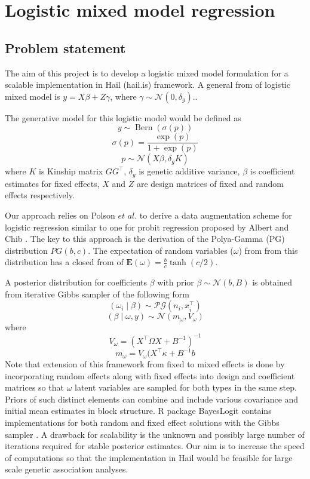 \documentclass [12pt,a4paper]{report}
\begin{document}
\section*{Logistic mixed model regression}
\subsection*{Problem statement}
The aim of this project is to develop a logistic mixed model formulation for a scalable implementation in Hail (hail.is) framework.
A general from of logistic mixed model is   \( y=X\beta + Z\gamma \), where \(\gamma \sim \mathcal{N}(0,\delta_g).\).\par 
The generative model for this logistic model would be defined as \[ y \sim \operatorname{Bern} (\sigma(p)) \]  \[\sigma(p)=\frac{\exp(p)}{1+\exp(p)} \] \[p \sim \mathcal{N}(X\beta, \delta_g K) \]  where $K$ is Kinship matrix $GG^{\intercal}$, $\delta_g$ is genetic additive variance, $\beta$ is coefficient estimates for fixed effects, $X$ and $Z$ are design matrices of fixed and random effects respectively.\par
Our approach relies on Polson $\textit{et al.}$ \cite{polson_bayesian_2012} to derive a data augmentation scheme for logistic regression similar to one for probit regression proposed by Albert and Chib \cite{albert_bayesian_1993}. The key to this approach is the derivation of the Polya-Gamma (PG) distribution $PG(b,c)$. The expectation of random variables ($\omega$) from from this distribution has a closed from of \(\mathbf{E}(\omega)=\frac{b}{c}\tanh(c/2)\). \par 
A posterior distribution for coefficients $\beta$ with prior   \(\beta \sim \mathcal{N}(b,B) \) is obtained from iterative Gibbs sampler of the following form \[(\omega_i \mid \beta ) \sim  \mathcal{PG}(n_i,x^{\intercal}_i)  \]    \[(\beta \mid \omega,y ) \sim  \mathcal{N}(m_\omega,V_\omega)  \] where    \[ V_\omega = (X^{\intercal} \Omega X + B^{-1})^{-1}  \]   \[ m_\omega = V_\omega(X^{\intercal}\kappa +  B^{-1}b \] 
Note that extension of this framework from fixed to mixed effects  is done by incorporating random effects along with fixed effects into design and coefficient matrices so that $\omega$ latent variables are sampled for both types in the same step. Priors of such distinct elements can combine and include various covariance and initial mean estimates in block structure. R package  BayesLogit contains implementations for both random and fixed effect solutions with the Gibbs sampler \cite{polson_bayesian_2012}. A drawback for scalability is the unknown and possibly large number of iterations required for stable posterior estimates. Our aim is to increase the speed of computations so that the implementation in Hail would be feasible for large scale genetic association analyses. 
\end{document}
